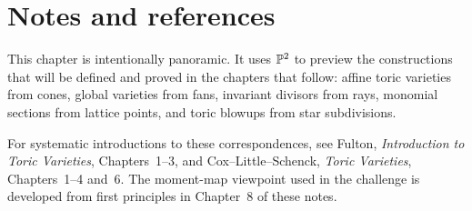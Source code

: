 \section*{Notes and references}

This chapter is intentionally panoramic. It uses \(\mathbb{P}^2\) to preview
the constructions that will be defined and proved in the chapters
that follow: affine toric varieties from cones, global varieties from
fans, invariant divisors from rays, monomial sections from lattice
points, and toric blowups from star subdivisions.

For systematic introductions to these correspondences, see Fulton,
\emph{Introduction to Toric Varieties}, Chapters~1--3, and
Cox--Little--Schenck, \emph{Toric Varieties}, Chapters~1--4 and~6.
The moment-map viewpoint used in the challenge is developed from
first principles in Chapter~8 of these notes.
